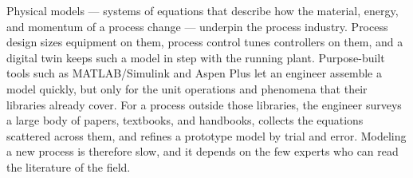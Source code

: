 
Physical models --- systems of equations that describe how the material, energy, and momentum
of a process change --- underpin the process industry. Process design sizes equipment on them,
process control tunes controllers on them, and a digital twin keeps such a model in step with the
running plant\cite{DigitalTwin}. Purpose-built tools such as MATLAB/Simulink\cite{simulink} and
Aspen Plus\cite{aspen} let an engineer assemble a model quickly, but only for the unit operations
and phenomena that their libraries already cover. For a process outside those libraries, the
engineer surveys a large body of papers, textbooks, and handbooks, collects the equations
scattered across them, and refines a prototype model by trial and error. Modeling a new process
is therefore slow, and it depends on the few experts who can read the literature of the field.

